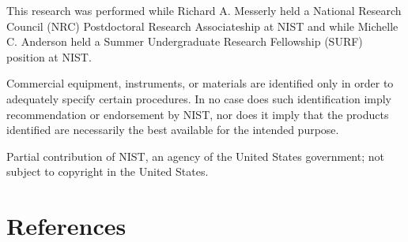 \documentclass[preprint,review,12pt]{elsarticle}
\begin{document}
	This research was performed while Richard A. Messerly held a National Research Council (NRC) Postdoctoral Research Associateship at NIST and while Michelle C. Anderson held a Summer Undergraduate Research Fellowship (SURF) position at NIST. 

	Commercial equipment, instruments, or materials are identified only in order to adequately specify certain procedures. In no case does such identification imply recommendation or endorsement by NIST, nor does it imply that the products identified are necessarily the best available for the intended purpose.
	
	Partial contribution of NIST, an agency of the United States government; not subject to copyright in the United States.
	
	\section*{References}
	
	
	
		
\end{document}
